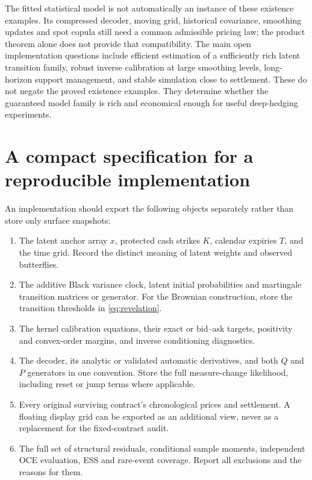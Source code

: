 \documentclass[11pt,a4paper]{article}
\numberwithin{equation}{section}
\theoremstyle{definition}\newtheorem{definition}[theorem]{Definition}
\theoremstyle{remark}\newtheorem{remark}[theorem]{Remark}
\begin{document}
The fitted statistical model is not automatically an instance of these existence examples. Its compressed decoder, moving grid, historical covariance, smoothing updates and spot copula still need a common admissible pricing law; the product theorem alone does not provide that compatibility. The main open implementation questions include efficient estimation of a sufficiently rich latent transition family, robust inverse calibration at large smoothing levels, long-horizon support management, and stable simulation close to settlement. These do not negate the proved existence examples. They determine whether the guaranteed model family is rich and economical enough for useful deep-hedging experiments.

\appendix
\section{A compact specification for a reproducible implementation}
\label{app:implementation}
An implementation should export the following objects separately rather than store only surface snapshots:
\begin{enumerate}
\item The latent anchor array $x$, protected cash strikes $K$, calendar expiries $T$, and the time grid. Record the distinct meaning of latent weights and observed butterflies.
\item The additive Black variance clock, latent initial probabilities and martingale transition matrices or generator. For the Brownian construction, store the transition thresholds in \eqref{eq:revelation}.
\item The kernel calibration equations, their exact or bid--ask targets, positivity and convex-order margins, and inverse conditioning diagnostics.
\item The decoder, its analytic or validated automatic derivatives, and both $Q$ and $P$ generators in one convention. Store the full measure-change likelihood, including reset or jump terms where applicable.
\item Every original surviving contract's chronological prices and settlement. A floating display grid can be exported as an additional view, never as a replacement for the fixed-contract audit.
\item The full set of structural residuals, conditional sample moments, independent OCE evaluation, ESS and rare-event coverage. Report all exclusions and the reasons for them.
\end{enumerate}
\end{document}
